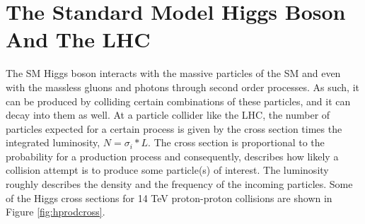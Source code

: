
\section{The Standard Model Higgs Boson And The LHC}

The SM Higgs boson interacts with the massive particles of the SM and even with the massless gluons and photons through second order processes. As such, it can be produced by colliding certain combinations of these particles, and it can decay into them as well. At a particle collider like the LHC, the number of particles expected for a certain process is given by the cross section times the integrated luminosity, $N = \sigma_i*L$. The cross section is proportional to the probability for a production process and consequently, describes how likely a collision attempt is to produce some particle(s) of interest. The luminosity roughly describes the density and the frequency of the incoming particles. Some of the Higgs cross sections for 14 TeV proton-proton collisions are shown in Figure \ref{fig:hprodcross}. 

